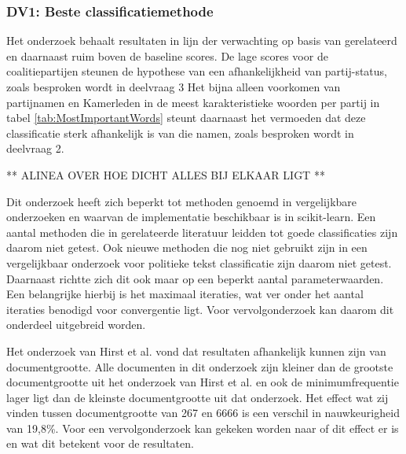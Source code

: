 \subsubsection{DV1: Beste classificatiemethode}
Het onderzoek behaalt resultaten in lijn der verwachting op basis van gerelateerd en daarnaast ruim boven de baseline scores. De lage scores voor de coalitiepartijen steunen de hypothese van een afhankelijkheid van partij-status, zoals besproken wordt in deelvraag 3 Het bijna alleen voorkomen van partijnamen en Kamerleden in de meest karakteristieke woorden per partij in tabel \ref{tab:MostImportantWords} steunt daarnaast het vermoeden dat deze classificatie sterk afhankelijk is van die namen, zoals besproken wordt in deelvraag 2.  \par
** ALINEA OVER HOE DICHT ALLES BIJ ELKAAR LIGT **\par
Dit onderzoek heeft zich beperkt tot methoden genoemd in vergelijkbare onderzoeken en waarvan de implementatie beschikbaar is in scikit-learn. Een aantal methoden die in gerelateerde literatuur leidden tot goede classificaties zijn daarom niet getest. Ook nieuwe methoden die nog niet gebruikt zijn in een vergelijkbaar onderzoek voor politieke tekst classificatie zijn daarom niet getest. Daarnaast richtte zich dit ook maar op een beperkt aantal parameterwaarden. Een belangrijke hierbij is het maximaal iteraties, wat ver onder het aantal iteraties benodigd voor convergentie ligt. Voor vervolgonderzoek kan daarom dit onderdeel uitgebreid worden.\par
Het onderzoek van Hirst et al. vond dat resultaten afhankelijk kunnen zijn van documentgrootte. Alle documenten in dit onderzoek zijn kleiner dan de grootste documentgrootte uit het onderzoek van Hirst et al. en ook de minimumfrequentie lager ligt dan de kleinste documentgrootte uit dat onderzoek.
Het effect wat zij vinden tussen documentgrootte van 267 en 6666 is een verschil in nauwkeurigheid van 19,8\%. Voor een vervolgonderzoek kan gekeken worden naar of dit effect er is en wat dit betekent voor de resultaten.\par

